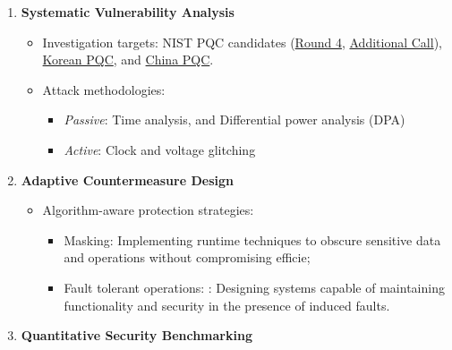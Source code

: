 \begin{enumerate}[leftmargin=*, label=\textbf{\arabic*.}, series=main]
    \item \textbf{Systematic Vulnerability Analysis}
    \begin{itemize}[leftmargin=2em]
        \item Investigation targets: NIST PQC candidates (\href{https://csrc.nist.gov/projects/post-quantum-cryptography/round-4-submissions}{Round 4}, \href{https://csrc.nist.gov/projects/pqc-dig-sig/round-2-additional-signatures}{Additional Call}), 
        \href{https://www.kpqc.or.kr/competition.html}{Korean PQC}, and \href{https://niccs.org.cn/en/notice/}{China PQC}.
        \item Attack methodologies:
        \begin{itemize}
            \item \textit{Passive}: Time analysis, and Differential power analysis (DPA)
            \item \textit{Active}: Clock and voltage glitching
        \end{itemize}
    \end{itemize}
    
    \item \textbf{Adaptive Countermeasure Design}
    \begin{itemize}[leftmargin=2em]
        \item Algorithm-aware protection strategies:
        \begin{itemize}
            \item Masking: Implementing runtime techniques to obscure sensitive data and operations without compromising efficie;
            \item Fault tolerant operations: : Designing systems capable of maintaining functionality and security in the presence of induced faults.
        \end{itemize}
    \end{itemize}
    
    \item \textbf{Quantitative Security Benchmarking}
    \begin{center}
    \end{center}
\end{enumerate}

